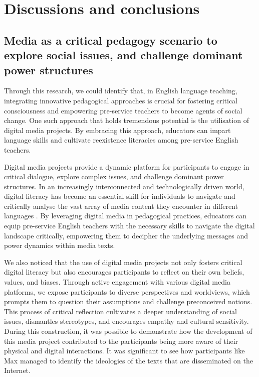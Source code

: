 \documentclass[english]{textolivre}
\begin{document}
\section{Discussions and conclusions}\label{sec-secoes}
\subsection{Media as a critical pedagogy scenario to explore social issues, and challenge dominant power structures}
Through this research, we could identify that, in English language teaching, integrating innovative pedagogical approaches is crucial for fostering critical consciousness and empowering pre-service teachers to become agents of social change. One such approach that holds tremendous potential is the utilisation of digital media projects. By embracing this approach, educators can impart language skills and cultivate reexistence literacies among pre-service English teachers.

Digital media projects provide a dynamic platform for participants to engage in critical dialogue, explore complex issues, and challenge dominant power structures. In an increasingly interconnected and technologically driven world, digital literacy has become an essential skill for individuals to navigate and critically analyse the vast array of media content they encounter in different languages \cite{garcia2023}. By leveraging digital media in pedagogical practices, educators can equip pre-service English teachers with the necessary skills to navigate the digital landscape critically, empowering them to decipher the underlying messages and power dynamics within media texts.

We also noticed that the use of digital media projects not only fosters critical digital literacy but also encourages participants to reflect on their own beliefs, values, and biases. Through active engagement with various digital media platforms, we expose participants to diverse perspectives and worldviews, which prompts them to question their assumptions and challenge preconceived notions. This process of critical reflection cultivates a deeper understanding of social issues, dismantles stereotypes, and encourages empathy and cultural sensitivity. During this construction, it was possible to demonstrate how the development of this media project contributed to the participants being more aware of their physical and digital interactions. It was significant to see how participants like Max managed to identify the ideologies of the texts that are disseminated on the Internet.
\end{document}
